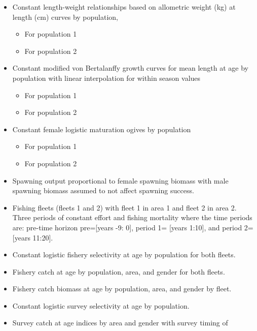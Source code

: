 \documentclass[12pt]{article}
\begin{document}
\begin{itemize}
	\item Constant length-weight relationships based on allometric weight (kg) at length (cm) curves by population,
	\begin{itemize}
		\item For population 1
		\item For population 2
	\end{itemize}

	\item Constant modified von Bertalanffy growth curves for mean length at age by population with linear interpolation for within season values
	\begin{itemize}
		\item For population 1
		\item For population 2
	\end{itemize}

	\item Constant female logistic maturation ogives by population
	\begin{itemize}
		\item For population 1
		\item For population 2
	\end{itemize}

	\item Spawning output proportional to female spawning biomass with male spawning biomass assumed to not affect spawning success.
	
	\item Fishing fleets (fleets 1 and 2) with fleet 1 in area 1 and fleet 2 in area 2. Three periods of constant effort and fishing mortality where the time periods are: pre-time horizon pre=[years -9: 0], period 1= [years 1:10], and period 2=[years 11:20].
	
	\item Constant logistic fishery selectivity at age by population for both fleets.
	
	\item Fishery catch at age by population, area, and gender for both fleets.
	
	\item Fishery catch biomass at age by population, area, and gender by fleet.
	
	\item Constant logistic survey selectivity at age by population.
	
	\item Survey catch at age indices by area and gender with survey timing of
	

\end{itemize}
\end{document}

